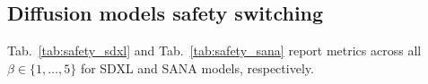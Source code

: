 

% 


\subsection{Diffusion models safety switching}
\label{sec:safety_switching_suppl_diffusion}

Tab.~\ref{tab:safety_sdxl} and Tab.~\ref{tab:safety_sana} report metrics across all $\beta\in\{1,\dots,5\}$ for SDXL and SANA models, respectively. 





